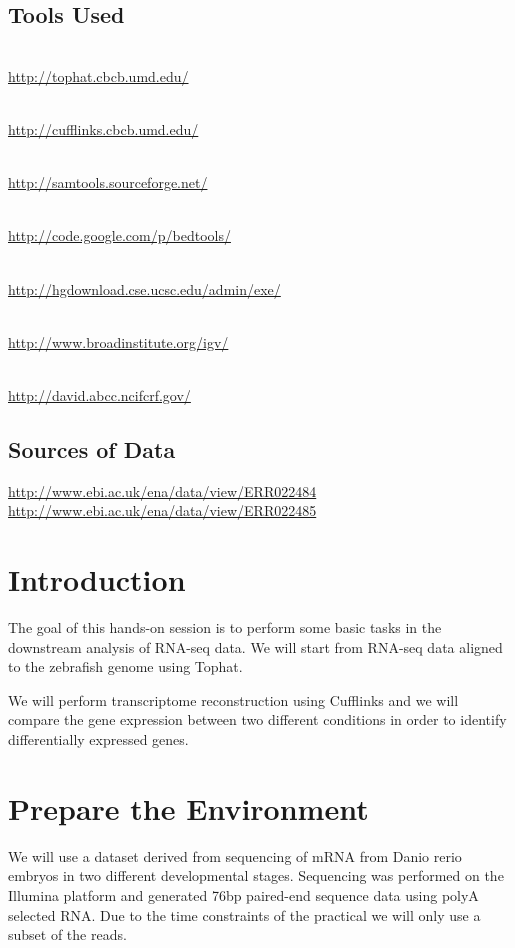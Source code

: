 \subsection{Tools Used}
\begin{description}[style=multiline,labelindent=0cm,align=left,leftmargin=1cm]
  \item[Tophat] \hfill\\
  	\url{http://tophat.cbcb.umd.edu/}
  \item[Cufflinks] \hfill\\
  	\url{http://cufflinks.cbcb.umd.edu/}
  \item[Samtools] \hfill\\
  	\url{http://samtools.sourceforge.net/}
  \item[BEDTools] \hfill\\
  	\url{http://code.google.com/p/bedtools/}
  \item[UCSC tools] \hfill\\
  	\url{http://hgdownload.cse.ucsc.edu/admin/exe/}
  \item[IGV] \hfill\\
  	\url{http://www.broadinstitute.org/igv/}
  \item[DAVID Functional Analysis] \hfill\\
  	\url{http://david.abcc.ncifcrf.gov/}
\end{description}

\subsection{Sources of Data}
\url{http://www.ebi.ac.uk/ena/data/view/ERR022484}\\
\url{http://www.ebi.ac.uk/ena/data/view/ERR022485}

\newpage

\section{Introduction}
The goal of this hands-on session is to perform some basic tasks in the
downstream analysis of RNA-seq data. We will start from RNA-seq data aligned to
the zebrafish genome using Tophat.

We will perform transcriptome reconstruction using Cufflinks and we will compare
the gene expression between two different conditions in order to identify
differentially expressed genes.

\section{Prepare the Environment}
We will use a dataset derived from sequencing of mRNA from Danio rerio embryos
in two different developmental stages. Sequencing was performed on the Illumina
platform and generated 76bp paired-end sequence data using polyA selected RNA.
Due to the time constraints of the practical we will only use a subset of the
reads.

